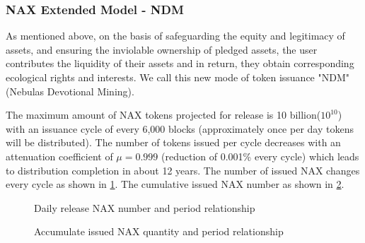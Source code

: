 \subsubsection{NAX Extended Model - NDM}
As mentioned above, on the basis of safeguarding the equity and legitimacy of assets, and ensuring the inviolable ownership of pledged assets, the user contributes the liquidity of their assets and in return, they obtain corresponding ecological rights and interests. We call this new mode of token issuance "NDM" (Nebulas Devotional Mining). 

The maximum amount of NAX tokens projected for release is 10 billion(\(10^{10}\)) with an issuance cycle of every 6,000 blocks (approximately once per day tokens will be distributed). The number of tokens issued per cycle decreases with an attenuation coefficient of $\mu=0.999$ (reduction of 0.001\% every cycle) which leads to distribution completion in about 12 years. The number of issued NAX changes every cycle as shown in \ref{dist}. The cumulative issued NAX number as shown in \ref{acc}.

\begin{figure}
\centering
    \caption{Daily release NAX number and period relationship}\label{dist}
\end{figure}


\begin{figure}
\centering
\caption{Accumulate issued NAX quantity and period relationship}\label{acc}
\end{figure}

